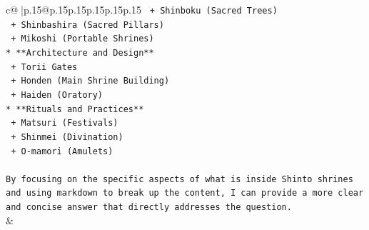 \documentclass{article}
\begin{document}
{\begin{supertabular}{c@{$\;$}|p{.15\linewidth}@{}p{.15\linewidth}p{.15\linewidth}p{.15\linewidth}p{.15\linewidth}p{.15\linewidth}}
{{{\texttt{	+ Shinboku (Sacred Trees)} \\
\texttt{	+ Shinbashira (Sacred Pillars)} \\
\texttt{	+ Mikoshi (Portable Shrines)} \\
\texttt{* **Architecture and Design**} \\
\texttt{	+ Torii Gates} \\
\texttt{	+ Honden (Main Shrine Building)} \\
\texttt{	+ Haiden (Oratory)} \\
\texttt{* **Rituals and Practices**} \\
\texttt{	+ Matsuri (Festivals)} \\
\texttt{	+ Shinmei (Divination)} \\
\texttt{	+ O{-}mamori (Amulets)} \\
\\ 
\texttt{By focusing on the specific aspects of what is inside Shinto shrines and using markdown to break up the content, I can provide a more clear and concise answer that directly addresses the question.} \\
            }
        }
    }
    & \\ \\

\end{supertabular}
}
\end{document}
